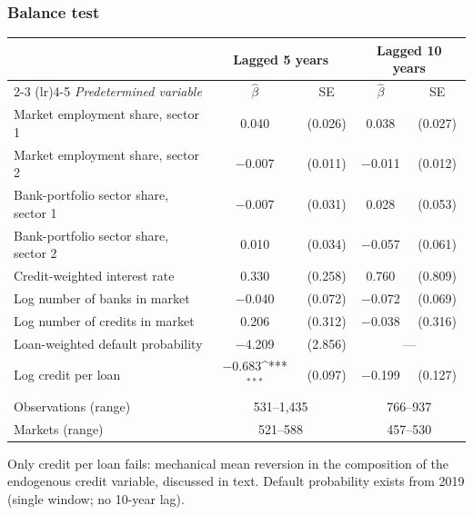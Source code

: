 \documentclass[aspectratio=169]{beamer}
\newcommand{\sym}[1]{\ifmmode^{#1}\else\(^{#1}\)\fi}
\begin{document}
\begin{frame}[noframenumbering]
\frametitle{\textbf{Balance test}} \label{balance}
\begin{center}
    \footnotesize
    \begin{tabular}{lcccc}
        \toprule
        & \multicolumn{2}{c}{\textbf{Lagged 5 years}} & \multicolumn{2}{c}{\textbf{Lagged 10 years}} \\
        \cmidrule(lr){2-3} \cmidrule(lr){4-5}
        \textit{Predetermined variable} & $\widehat{\beta}$ & SE & $\widehat{\beta}$ & SE \\
        \midrule
        Market employment share, sector 1     & \phantom{$-$}0.040 & (0.026) & \phantom{$-$}0.038 & (0.027) \\
        Market employment share, sector 2     & $-$0.007 & (0.011) & $-$0.011 & (0.012) \\
        Bank-portfolio sector share, sector 1 & $-$0.007 & (0.031) & \phantom{$-$}0.028 & (0.053) \\
        Bank-portfolio sector share, sector 2 & \phantom{$-$}0.010 & (0.034) & $-$0.057 & (0.061) \\
        Credit-weighted interest rate         & \phantom{$-$}0.330 & (0.258) & \phantom{$-$}0.760 & (0.809) \\
        Log number of banks in market         & $-$0.040 & (0.072) & $-$0.072 & (0.069) \\
        Log number of credits in market       & \phantom{$-$}0.206 & (0.312) & $-$0.038 & (0.316) \\
        Loan-weighted default probability     & $-$4.209 & (2.856) & \multicolumn{2}{c}{---} \\
        Log credit per loan                   & $-$0.683\sym{***} & (0.097) & $-$0.199 & (0.127) \\
        \midrule
        Observations (range)              & \multicolumn{2}{c}{531--1{,}435} & \multicolumn{2}{c}{766--937} \\
        Markets (range)                   & \multicolumn{2}{c}{521--588} & \multicolumn{2}{c}{457--530} \\
        \bottomrule
    \end{tabular}
\end{center}
{\tiny Only credit per loan fails: mechanical mean reversion in the composition of the endogenous credit variable, discussed in text. Default probability exists from 2019 (single window; no 10-year lag).}\\
\hyperlink{robustness}{}
\end{frame}
\end{document}
